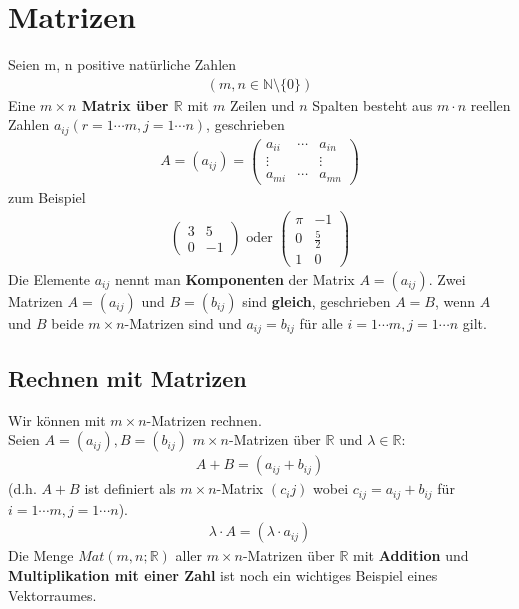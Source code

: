 \documentclass[11pt]{report}
\newcommand*\Zb[1] {\mathbb{#1}}
\newcommand*\f[1] {\textbf{#1}}
\begin{document}
\section{Matrizen}
Seien m, n positive natürliche Zahlen
\begin{align}
 (m, n \in \Zb{N}\setminus\{0\})
\end{align}
Eine \textbf{$m\times n$ Matrix über $\Zb{R}$} mit $m$ Zeilen und $n$ Spalten besteht aus $m \cdot n$ reellen Zahlen
$a_{ij} (r=1\cdots m, j=1\cdots n)$, geschrieben
\begin{align}
A = (a_{ij}) = \begin{pmatrix} a_{ii} & \cdots & a_{in} \\ \vdots &  & \vdots \\ a_{mi} & \cdots & a_{mn} \end{pmatrix}
\end{align}
zum Beispiel
\begin{align}
\begin{pmatrix} 3 & 5 \\ 0 & -1 \end{pmatrix}
\text{ oder } \begin{pmatrix} \pi & -1 \\ 0 &  \frac{5}{2} \\ 1 & 0 \end{pmatrix} 
\end{align}
Die Elemente $a_{ij}$ nennt man \f{Komponenten} der Matrix $A = (a_{ij})$. Zwei Matrizen $A =
(a_{ij})$ und $B = (b_{ij})$ sind \f{gleich}, geschrieben $A=B$, wenn $A$ und $B$ beide $m\times n$-Matrizen sind und
$a_{ij}=b_{ij}$ für alle $i=1\cdots m, j=1\cdots n$ gilt.

\subsection{Rechnen mit Matrizen}
Wir können mit $m\times n$-Matrizen rechnen.\\
Seien $A = (a_{ij}), B = (b_{ij})$ $m\times n$-Matrizen über $\Zb{R}$ und $\lambda \in \Zb{R}$:
\begin{align}
 A + B = (a_{ij} + b_{ij})
\end{align}
(d.h. $A + B$ ist definiert als $m\times n$-Matrix $(c_ij)$ wobei $c_{ij}=a_{ij}+b_{ij}$ für $i=1\cdots m, j=1\cdots n$).
\begin{align}
 \lambda \cdot A = (\lambda\cdot a_{ij})
\end{align}
Die Menge $Mat(m, n; \Zb{R})$ aller $m\times n$-Matrizen über $\Zb{R}$ mit \f{Addition} und \f{Multiplikation mit einer
Zahl} ist noch ein wichtiges Beispiel eines Vektorraumes.
\end{document}
